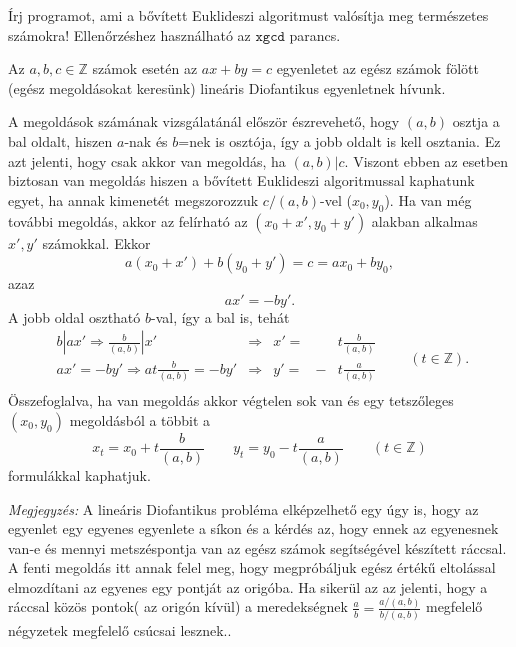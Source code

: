 \begin{exercise} Írj programot, ami a bővített Euklideszi algoritmust
  valósítja meg természetes számokra! Ellen\H orzéshez használható az
  $\mathtt{xgcd}$ parancs.
\end{exercise}

\begin{definition}
  Az $a,b,c\in\mathbb{Z}$ számok esetén az $ax+by=c$ egyenletet az egész
  számok fölött (egész megoldásokat keresünk) lineáris Diofantikus
  egyenletnek hívunk.
\end{definition}

A megoldások számának vizsgálatánál először észrevehet\H o, hogy $(a,b)$
osztja a bal oldalt, hiszen $a$-nak és $b$=nek is osztója, így a jobb oldalt
is kell osztania. Ez azt jelenti, hogy csak akkor van megoldás, ha $(a,b)|c$.
Viszont ebben az esetben biztosan van megoldás hiszen a b\H ovített
Euklideszi algoritmussal kaphatunk  egyet, ha annak kimenetét megszorozzuk
$c/(a,b)$-vel ($x_0, y_0$). Ha van még további megoldás, akkor az felírható
az $(x_0 + x', y_0 + y')$ alakban alkalmas $x',y'$ számokkal. Ekkor \[
  a(x_0+x')+b(y_0+y') = c = ax_0 + by_0,\] azaz \[ ax' = -by'. \]
A jobb oldal osztható $b$-val, így a bal is, tehát \[
  \begin{array}{lclrl}
    \displaystyle b|ax' \Rightarrow \frac{b}{(a,b)}|x' & \Rightarrow &
    x'= & &  \displaystyle t\frac{b}{(a,b)} \\
    \displaystyle ax' = -by' \Rightarrow at\frac{b}{(a,b)} = -by' & \Rightarrow &
    y'= & - & \displaystyle t\frac{a}{(a,b)}\\
  \end{array}\qquad (t\in\mathbb{Z}).\]
Összefoglalva, ha van megoldás akkor végtelen sok van és egy tetsz\H oleges
$(x_0, y_0)$ megoldásból a többit a
\[
  x_t = x_0 + t\frac{b}{(a,b)}\qquad y_t= y_0-t\frac{a}{(a,b)}\qquad(t\in\mathbb{Z})\]
formulákkal kaphatjuk.

\emph{Megjegyzés:} A lineáris Diofantikus probléma elképzelhet\H o egy úgy
is, hogy az egyenlet egy egyenes egyenlete a síkon és a kérdés az, hogy
ennek az egyenesnek van-e és mennyi metszéspontja van az egész számok segítségével
készített ráccsal. A fenti megoldás itt annak felel meg, hogy megpróbáljuk
egész érték\H u eltolással elmozdítani az egyenes egy pontját az origóba. Ha
sikerül az az jelenti, hogy a ráccsal közös pontok( az origón kívül) a
meredekségnek $\frac{a}{b}=\frac{a/(a,b)}{b/(a,b)}$ megfelel\H o négyzetek
megfelel\H o csúcsai lesznek..

